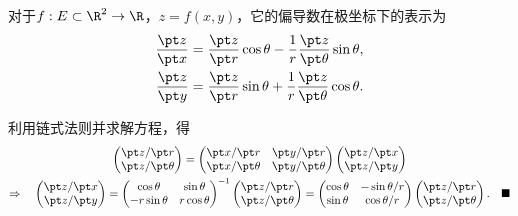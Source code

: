   \begin{thm}[偏导数的极坐标表示]
    \label{thm: 偏导数的极坐标表示}
    对于$f:E\subset\R^2\to\R$，$z=f(x,y)$，它的偏导数在极坐标下的表示为
    \[\begin{split}
      \frac{\pt z}{\pt x} &= \frac{\pt z}{\pt r}\cos\theta
        - \frac{1}{r}\frac{\pt z}{\pt\theta}\sin\theta,\\
      \frac{\pt z}{\pt y} &= \frac{\pt z}{\pt r}\sin\theta
       + \frac{1}{r}\frac{\pt z}{\pt\theta}\cos\theta.
    \end{split}\]
  \end{thm}
  \proof
    利用链式法则并求解方程，得
    \begin{gather*}
      \begin{pmatrix}
        \pt z/\pt r \\ \pt z/\pt \theta
      \end{pmatrix} =
      \begin{pmatrix}
        \pt x/\pt r & \pt y/\pt r \\
        \pt x/\pt \theta & \pt y/\pt\theta
      \end{pmatrix}
      \begin{pmatrix}
        \pt z/\pt x \\ \pt z/\pt y
      \end{pmatrix} \\
      \Rightarrow\quad
      \begin{pmatrix}
        \pt z/\pt x \\ \pt z/\pt y
      \end{pmatrix} =
      \begin{pmatrix}
        \cos\theta & \sin\theta \\
        -r\sin\theta & r\cos\theta
      \end{pmatrix}^{-1}
      \begin{pmatrix}
        \pt z/\pt r \\ \pt z/\pt \theta
      \end{pmatrix}=
      \begin{pmatrix}
        \cos\theta & -\sin\theta / r \\
        \sin\theta & \cos\theta / r
      \end{pmatrix}
      \begin{pmatrix}
        \pt z/\pt r \\ \pt z/\pt \theta
      \end{pmatrix}.\quad\blacksquare
    \end{gather*}

